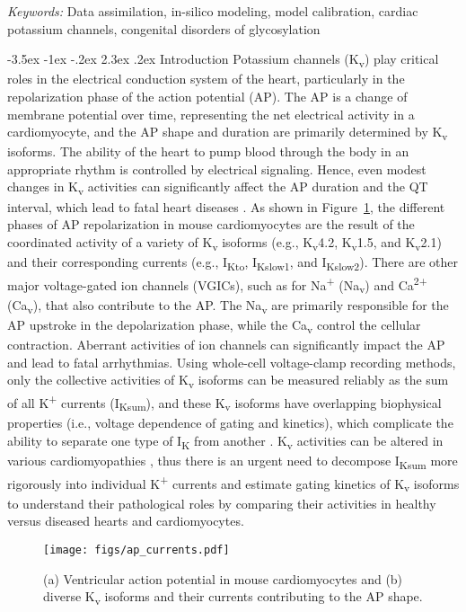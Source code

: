 \documentclass[11pt]{article}
\makeatletter
\renewcommand\section{\@startsection {section}{1}{\z@}%
                                   {-3.5ex \@plus -1ex \@minus -.2ex}%
                                   {2.3ex \@plus.2ex}%
                                   {\normalfont\fontfamily{phv}\fontsize{16}{19}\bfseries}}
\makeatother
\begin{document}
\noindent%
{\it Keywords:} Data assimilation, in-silico modeling, model calibration, cardiac potassium channels, congenital disorders of glycosylation

{} %

\section{Introduction}
Potassium channels (K\textsubscript{v}) play critical roles in the electrical conduction system of the heart, particularly in the repolarization phase of the action potential (AP). The AP is a change of membrane potential over time, representing the net electrical activity in a cardiomyocyte, and the AP shape and duration are primarily determined by K\textsubscript{v} isoforms. The ability of the heart to pump blood through the body in an appropriate rhythm is controlled by electrical signaling. Hence, even modest changes in K\textsubscript{v} activities can significantly affect the AP duration and the QT interval, which lead to fatal heart diseases \citep{ravens2008role}. As shown in Figure~\ref{fig:ap_currents}, the different phases of AP repolarization in mouse cardiomyocytes are the result of the coordinated activity of a variety of K\textsubscript{v} isoforms (e.g., K\textsubscript{v}4.2, K\textsubscript{v}1.5, and K\textsubscript{v}2.1) and their corresponding currents (e.g., I\textsubscript{Kto}, I\textsubscript{Kslow1}, and I\textsubscript{Kslow2}). There are other major voltage-gated ion channels (VGICs), such as for Na\textsuperscript{+} (Na\textsubscript{v}) and Ca\textsuperscript{2+} (Ca\textsubscript{v}), that also contribute to the AP. The Na\textsubscript{v} are primarily responsible for the AP upstroke in the depolarization phase, while the Ca\textsubscript{v} control the cellular contraction. Aberrant activities of ion channels can significantly impact the AP and lead to fatal arrhythmias. Using whole-cell voltage-clamp recording methods, only the collective activities of K\textsubscript{v} isoforms can be measured reliably as the sum of all K\textsuperscript{+} currents (I\textsubscript{Ksum}), and these K\textsubscript{v} isoforms have overlapping biophysical properties (i.e., voltage dependence of gating and kinetics), which complicate the ability to separate one type of I\textsubscript{K} from another \citep{brouillette2004functional}. K\textsubscript{v} activities can be altered in various cardiomyopathies \citep{tristani2001molecular,giudicessi2012potassium}, thus there is an urgent need to decompose I\textsubscript{Ksum} more rigorously into individual K\textsuperscript{+} currents and estimate gating kinetics of K\textsubscript{v} isoforms to understand their pathological roles by comparing their activities in healthy versus diseased hearts and cardiomyocytes.
\begin{figure}[!ht]
    \centering
    \texttt{[image: figs/ap\_currents.pdf]}
    \caption{(a) Ventricular action potential in mouse cardiomyocytes and (b) diverse K\textsubscript{v} isoforms and their currents contributing to the AP shape.}
    \label{fig:ap_currents}
\end{figure}
\end{document}
